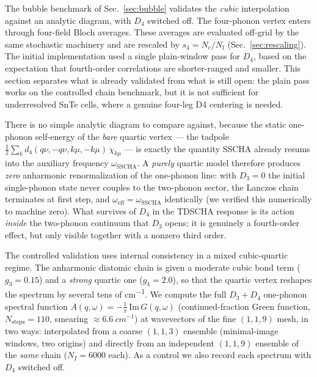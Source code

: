 \documentclass[11pt,a4paper]{article}
\newcommand{\Nc}{N_{\mathrm{c}}}
\newcommand{\Nf}{N_{\mathrm{f}}}
\begin{document}
The bubble benchmark of Sec.~\ref{sec:bubble} validates the \emph{cubic}
interpolation against an analytic diagram, with $D_4$ switched off. The
four-phonon vertex enters through four-field Bloch averages.  These
averages are evaluated off-grid by the same stochastic machinery and are
rescaled by $s_4=\Nc/\Nf$ (Sec.~\ref{sec:rescaling}).  The initial
implementation used a single plain-window pass for $D_4$, based on the
expectation that fourth-order correlations are shorter-ranged and smaller.
This section separates what is already validated from what is still open:
the plain pass works on the controlled chain benchmark, but it is not
sufficient for underresolved SnTe cells, where a genuine four-leg D4
centering is needed.

There is no simple analytic diagram to compare against, because the static
one-phonon self-energy of the \emph{bare} quartic vertex --- the tadpole
$\tfrac12 \sum_k d_4(q\nu,-q\nu,k\mu,-k\mu)\,\chi_{k\mu}$ --- is exactly the
quantity SSCHA already resums into the auxiliary frequency
$\omega_{\mathrm{SSCHA}}$. A \emph{purely} quartic model therefore produces
\emph{zero} anharmonic renormalization of the one-phonon line: with $D_3=0$
the initial single-phonon state never couples to the two-phonon sector, the
Lanczos chain terminates at first step, and $\omega_{\mathrm{eff}} =
\omega_{\mathrm{SSCHA}}$ identically (we verified this numerically to
machine zero). What survives of $D_4$ in the TDSCHA response is its action
\emph{inside} the two-phonon continuum that $D_3$ opens; it is genuinely a
fourth-order effect, but only visible together with a nonzero third order.

The controlled validation uses internal consistency in a mixed cubic-quartic
regime.  The anharmonic diatomic chain is given a moderate cubic bond term
($g_3 = 0.15$) and a \emph{strong} quartic one ($g_4 = 2.0$), so that the
quartic vertex reshapes the spectrum by several tens of \si{cm^{-1}}. We
compute the full $D_3{+}D_4$ one-phonon spectral function
$A(q,\omega) = -\tfrac1\pi\,\mathrm{Im}\,G(q,\omega)$ (continued-fraction
Green function, $N_{\mathrm{steps}}=110$, smearing $\approx\SI{6.6}{cm^{-1}}$)
at wavevectors of the fine $(1,1,9)$ mesh, in two ways: interpolated from a
coarse $(1,1,3)$ ensemble (minimal-image windows, two origins) and directly
from an independent $(1,1,9)$ ensemble of the \emph{same} chain
($N_I = 6000$ each). As a control we also record each spectrum with $D_4$
switched off.
\end{document}

